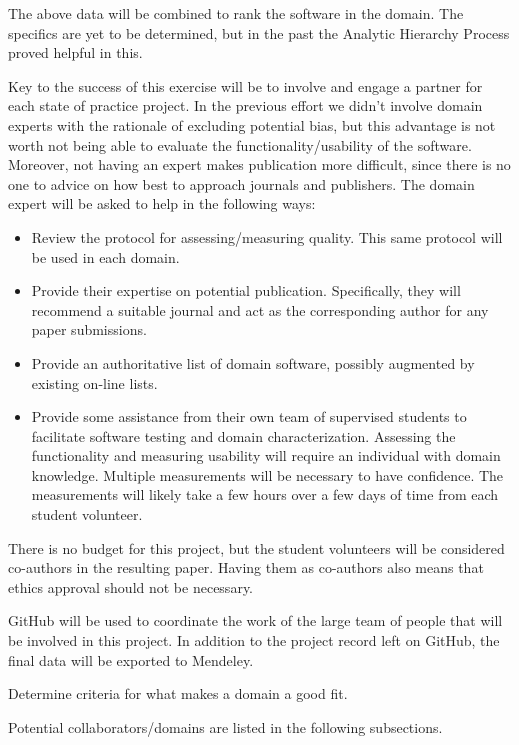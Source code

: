 \documentclass[12pt]{article}
\begin{document}
The above data will be combined to rank the software in the domain.  The
specifics are yet to be determined, but in the past the Analytic Hierarchy
Process proved helpful in this.

Key to the success of this exercise will be to involve and engage a partner for
each state of practice project.  In the previous effort we didn't involve domain
experts with the rationale of excluding potential bias, but this advantage is
not worth not being able to evaluate the functionality/usability of the software.
Moreover, not having an expert makes publication more difficult, since there is
no one to advice on how best to approach journals and publishers.  The domain
expert will be asked to help in the following ways:

\begin{itemize}
\item Review the protocol for assessing/measuring quality.  This same protocol
  will be used in each domain.
\item Provide their expertise on potential publication.  Specifically, they will
  recommend a suitable journal and act as the corresponding author for any paper
  submissions. 
\item Provide an authoritative list of domain software, possibly augmented by
  existing on-line lists.
\item Provide some assistance from their own team of supervised students to
  facilitate software testing and domain characterization.  Assessing the
  functionality and measuring usability will require an individual with domain
  knowledge.  Multiple measurements will be necessary to have confidence.  The
  measurements will likely take a few hours over a few days of time from each
  student volunteer.
\end{itemize}

There is no budget for this project, but the student volunteers will be
considered co-authors in the resulting paper.  Having them as co-authors also
means that ethics approval should not be necessary.

GitHub will be used to coordinate the work of the large team of people that will
be involved in this project.  In addition to the project record left on GitHub,
the final data will be exported to Mendeley.

Determine criteria for what makes a domain a good fit.

Potential collaborators/domains are listed in the following subsections.
\end{document}
